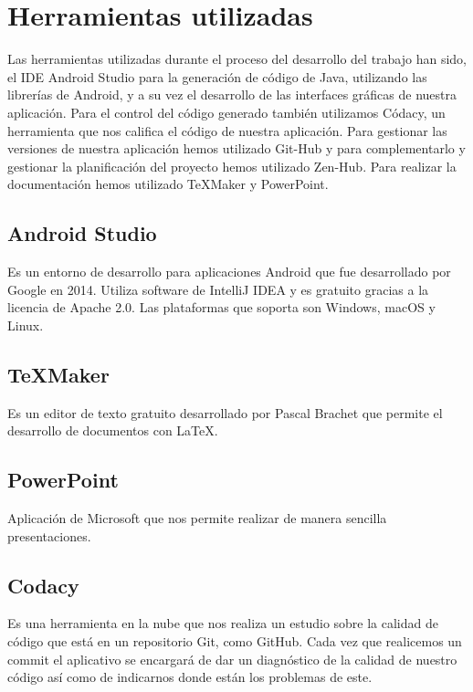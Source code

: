 
\section{Herramientas utilizadas}
Las herramientas utilizadas durante el proceso del desarrollo del trabajo han sido, el IDE Android Studio para la generación de código de Java, utilizando las librerías de Android, y a su vez el desarrollo de las interfaces gráficas de nuestra aplicación. Para el control del código generado también utilizamos Códacy, un herramienta que nos califica el código de nuestra aplicación.
Para gestionar las versiones de nuestra aplicación hemos utilizado Git-Hub y para complementarlo y gestionar la planificación del proyecto hemos utilizado Zen-Hub.
Para realizar la documentación hemos utilizado \TeX{}Maker y PowerPoint.

\subsection{Android Studio}

Es un entorno de desarrollo para aplicaciones Android que fue desarrollado por Google en 2014. Utiliza software de IntelliJ IDEA y es gratuito gracias a la licencia de Apache 2.0.
Las plataformas que soporta son Windows, macOS y Linux.

\subsection{\TeX{}Maker}

Es un editor de texto gratuito desarrollado por Pascal Brachet que permite el desarrollo de documentos con La\TeX{}.

\subsection{PowerPoint}

Aplicación de Microsoft que nos permite realizar de manera sencilla presentaciones.

\subsection{Codacy}

Es una herramienta en la nube que nos realiza un estudio sobre la calidad de código que está en un repositorio Git, como GitHub. Cada vez que realicemos un commit el aplicativo se encargará de dar un diagnóstico de la calidad de nuestro código así como de indicarnos donde están los problemas de este.


